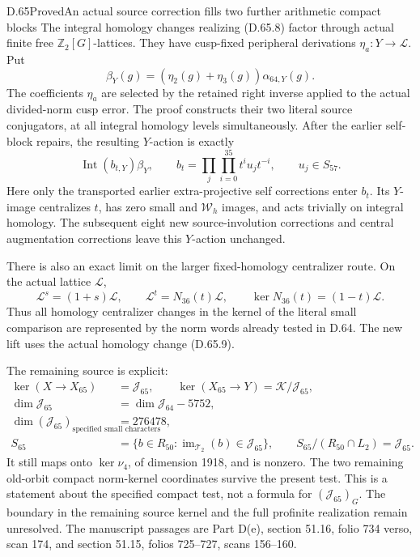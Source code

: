 \begin{statement}{D.65}{Proved}{An actual source correction fills two further arithmetic compact blocks}
The integral homology changes realizing (D.65.8) factor through actual
finite free \(\mathbb Z_2[G]\)-lattices. They have cusp-fixed peripheral
derivations \(\eta_a:Y\to\mathcal L\). Put
\[
 \beta_Y(g)=(\eta_2(g)+\eta_3(g))\alpha_{64,Y}(g).
 \tag{D.65.9}
\]
The coefficients \(\eta_a\) are selected by the retained right inverse
applied to the actual divided-norm cusp error. The proof constructs
their two literal source conjugators, at all integral homology levels
simultaneously. After the earlier self-block repairs, the resulting
\(Y\)-action is exactly
\[
 \operatorname{Int}(b_{t,Y})\beta_Y,
 \qquad b_t=\prod_j\prod_{i=0}^{35}t^iu_jt^{-i},
 \qquad u_j\in S_{57}.
 \tag{D.65.10}
\]
Here only the transported earlier extra-projective self corrections
enter \(b_t\). Its \(Y\)-image centralizes \(t\), has zero small and
\(\mathcal W_h\) images, and acts trivially on integral homology.
The subsequent eight new source-involution corrections and central
augmentation corrections leave this \(Y\)-action unchanged.

There is also an exact limit on the larger fixed-homology centralizer
route. On the actual lattice \(\mathcal L\),
\[
 \mathcal L^s=(1+s)\mathcal L,\qquad
 \mathcal L^t=N_{36}(t)\mathcal L,\qquad
 \ker N_{36}(t)=(1-t)\mathcal L.
 \tag{D.65.11}
\]
Thus all homology centralizer changes in the kernel of the literal
small comparison are represented by the norm words already tested in
D.64. The new lift uses the actual homology change (D.65.9).

The remaining source is explicit:
\[
 \begin{aligned}
 \ker(X\to X_{65})&=\mathcal J_{65},\qquad
 \ker(X_{65}\to Y)=\mathcal K/\mathcal J_{65},\\
 \dim\mathcal J_{65}&=\dim\mathcal J_{64}-5752,\\
 \dim(\mathcal J_{65})_{\text{specified small characters}}&=276478,\\
 S_{65}&=\{b\in R_{50}:
             \operatorname{im}_{\mathcal T_2}(b)\in\mathcal J_{65}\},\qquad
 S_{65}/(R_{50}\cap L_2)=\mathcal J_{65}.
 \end{aligned}
 \tag{D.65.12}
\]
It still maps onto \(\ker\nu_4\), of dimension 1918, and is nonzero.
The two remaining old-orbit compact norm-kernel coordinates survive
the present test. This is a statement about the specified compact
test, not a formula for \((\mathcal J_{65})_G\). The boundary in the
remaining source kernel and the full profinite realization remain
unresolved. The manuscript passages are Part D(e), section 51.16,
folio 734 verso, scan 174, and section 51.15, folios 725--727,
scans 156--160.
\end{statement}

